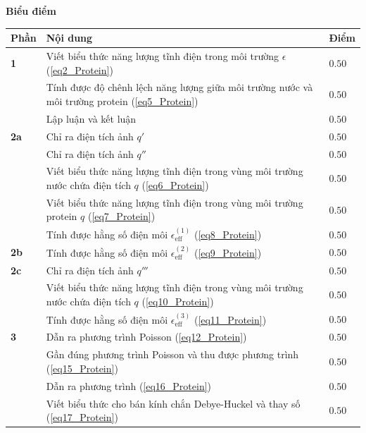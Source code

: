 \textbf{Biểu điểm}
\begin{center}
\begin{tabular}{|>{\centering\arraybackslash}m{1cm}|>{\raggedright\arraybackslash}m{14cm}| >{\centering\arraybackslash}m{1cm}|}
    \hline
    \textbf{Phần} & \textbf{Nội dung} & \textbf{Điểm} \\
    \hline
    \textbf{1} & Viết biểu thức năng lượng tĩnh điện trong môi trường $\epsilon$ (\ref{eq2_Protein}) & $0.50$ \\
    \cline{2-3}
    &  Tính được độ chênh lệch năng lượng giữa môi trường nước và môi trường protein (\ref{eq5_Protein}) & $0.50$ \\
    \cline{2-3}
    &  Lập luận và kết luận & $0.50$ \\
    \hline
    \textbf{2a} & Chỉ ra điện tích ảnh $q'$ & $0.50$ \\
    \cline{2-3}
     & Chỉ ra điện tích ảnh $q''$ & $0.50$ \\
    \cline{2-3}
    & Viết biểu thức năng lượng tĩnh điện trong vùng môi trường nước chứa điện tích $q$ (\ref{eq6_Protein}) & $0.50$ \\
    \cline{2-3}
    & Viết biểu thức năng lượng tĩnh điện trong vùng môi trường protein $q$ (\ref{eq7_Protein}) & $0.50$ \\
    \cline{2-3}
    & Tính được hằng số điện môi $\epsilon_{\text{eff}}^{(1)}$ (\ref{eq8_Protein}) & $0.50$ \\
    \hline
    \textbf{2b} & Tính được hằng số điện môi $\epsilon_{\text{eff}}^{(2)}$ (\ref{eq9_Protein}) & $0.50$ \\
    \hline
    \textbf{2c} & Chỉ ra điện tích ảnh $q'''$ & $0.50$ \\
    \cline{2-3}
    & Viết biểu thức năng lượng tĩnh điện trong vùng môi trường nước chứa điện tích $q$ (\ref{eq10_Protein}) & $0.50$ \\
    \cline{2-3}
    & Tính được hằng số điện môi $\epsilon_{\text{eff}}^{(3)}$ (\ref{eq11_Protein}) & $0.50$ \\
    \hline
    \textbf{3} & Dẫn ra phương trình Poisson (\ref{eq12_Protein}) & $0.50$ \\
    \cline{2-3}
    & Gần đúng phương trình Poisson và thu được phương trình (\ref{eq15_Protein}) & $0.50$ \\
    \cline{2-3}
    & Dẫn ra phương trình (\ref{eq16_Protein}) & $0.50$ \\
    \cline{2-3}
    & Viết biểu thức cho bán kính chắn Debye-Huckel và thay số (\ref{eq17_Protein}) & $0.50$ \\
    \hline
\end{tabular}
\end{center}

